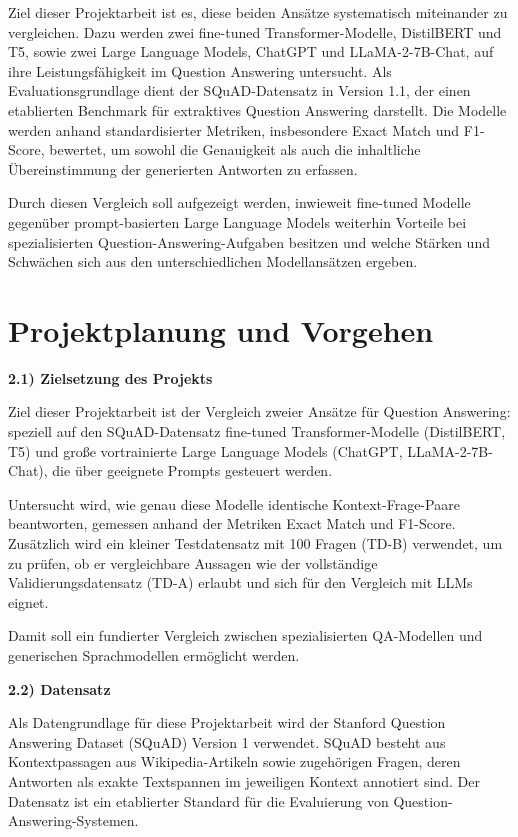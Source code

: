 \documentclass[12pt,oneside]{article}
\begin{document}
Ziel dieser Projektarbeit ist es, diese beiden Ansätze systematisch
miteinander zu vergleichen. Dazu werden zwei fine-tuned
Transformer-Modelle, DistilBERT und T5, sowie zwei Large Language
Models, ChatGPT und LLaMA-2-7B-Chat, auf ihre Leistungsfähigkeit im
Question Answering untersucht. Als Evaluationsgrundlage dient der
SQuAD-Datensatz in Version 1.1, der einen etablierten Benchmark für
extraktives Question Answering darstellt. Die Modelle werden anhand
standardisierter Metriken, insbesondere Exact Match und F1-Score,
bewertet, um sowohl die Genauigkeit als auch die inhaltliche
Übereinstimmung der generierten Antworten zu erfassen.

Durch diesen Vergleich soll aufgezeigt werden, inwieweit fine-tuned
Modelle gegenüber prompt-basierten Large Language Models weiterhin
Vorteile bei spezialisierten Question-Answering-Aufgaben besitzen und
welche Stärken und Schwächen sich aus den unterschiedlichen
Modellansätzen ergeben.

  
  \section{Projektplanung und Vorgehen}

  \textbf{2.1) Zielsetzung des Projekts}

Ziel dieser Projektarbeit ist der Vergleich zweier Ansätze für Question
Answering: speziell auf den SQuAD-Datensatz \citep{rajpurkar2016squad} fine-tuned
Transformer-Modelle (DistilBERT, T5) und große vortrainierte Large
Language Models (ChatGPT, LLaMA-2-7B-Chat), die über geeignete Prompts
gesteuert werden.

Untersucht wird, wie genau diese Modelle identische Kontext-Frage-Paare
beantworten, gemessen anhand der Metriken Exact Match und F1-Score.
Zusätzlich wird ein kleiner Testdatensatz mit 100 Fragen (TD-B)
verwendet, um zu prüfen, ob er vergleichbare Aussagen wie der
vollständige Validierungsdatensatz (TD-A) erlaubt und sich für den
Vergleich mit LLMs eignet.

Damit soll ein fundierter Vergleich zwischen spezialisierten QA-Modellen
und generischen Sprachmodellen ermöglicht werden.

\textbf{2.2) Datensatz}

Als Datengrundlage für diese Projektarbeit wird der Stanford Question
Answering Dataset (SQuAD) Version 1 verwendet. SQuAD besteht aus
Kontextpassagen aus Wikipedia-Artikeln sowie zugehörigen Fragen, deren
Antworten als exakte Textspannen im jeweiligen Kontext annotiert sind.
Der Datensatz ist ein etablierter Standard für die Evaluierung von
Question-Answering-Systemen.
\end{document}
